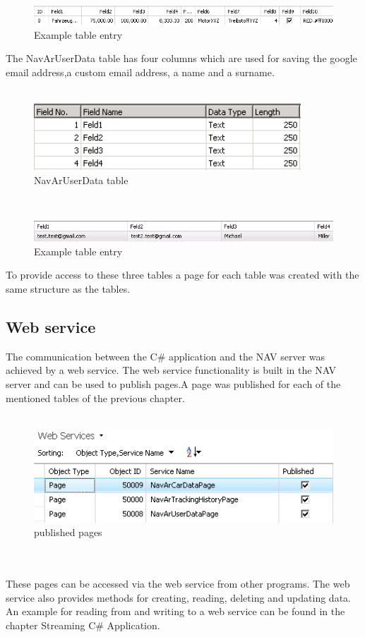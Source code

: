 \begin{figure}[htbp]
\centering
\includegraphics[width=\textwidth,height=\textheight,keepaspectratio]{graphics/cardatatablentry.png}
\caption{Example table entry}
\end{figure}
\newline
The NavArUserData table has four columns which are used for saving the google email address,a custom email address, a name and a surname.
\\\\
\begin{figure}[htbp]
\centering
\includegraphics[width=100mm,height=\textheight,keepaspectratio]{graphics/userdatatable.png}
\caption{NavArUserData table }
\end{figure}
\\
\begin{figure}[htbp]
\centering
\includegraphics[width=\textwidth,height=\textheight,keepaspectratio]{graphics/userdatatableentry.png}
\caption{Example table entry}
\end{figure}
\newpage
To provide access to these three tables a page for each table was created with the same structure as the tables.  
\subsection{Web service}
The communication between the C\# application and the NAV server was achieved by a web service. The web service functionality is built in the NAV server and can be used to publish pages.A page was published for each of the mentioned tables of the previous chapter. 
\\\\
\begin{figure}[htbp]
\centering
\includegraphics[width=\textwidth,height=\textheight,keepaspectratio]{graphics/webservice.png}
\caption{published pages}
\end{figure}
\\\\
These pages can be accessed via the web service from other programs. The web service also provides methods for creating, reading, deleting and updating data.
An example for reading from and writing to a web service can be found in the chapter Streaming C\# Application.   
\newpage
